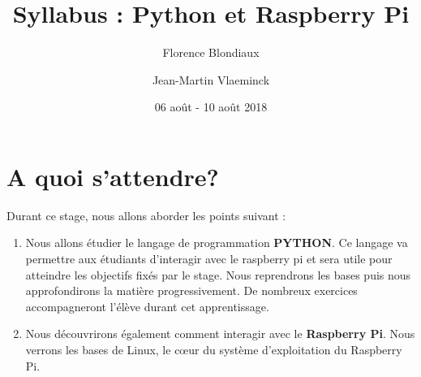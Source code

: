 \documentclass[12pt,a4paper,oneside]{report}
\title{Syllabus : Python et Raspberry Pi}
\author{Florence Blondiaux\and Jean-Martin Vlaeminck}
\date{06 août - 10 août 2018}
\begin{document}
\maketitle
\tableofcontents


\chapter{A quoi s'attendre?}

\vspace*{3cm}

Durant ce stage, nous allons aborder les points suivant :


\begin{minipage}[l]{0.70\textwidth}
	\begin{enumerate}
		\item Nous allons étudier le langage de programmation \textbf{PYTHON}. Ce langage va permettre aux étudiants d'interagir avec le raspberry pi et sera utile pour atteindre les objectifs fixés par le stage. Nous reprendrons les bases puis nous approfondirons la matière progressivement. De nombreux exercices accompagneront l'élève durant cet apprentissage.\\
		
		\item Nous découvrirons également comment interagir avec le \textbf{Raspberry Pi}. Nous verrons les bases de Linux, le c\oe{}ur du système d'exploitation du Raspberry Pi.
		
	\end{enumerate}
\end{minipage}
\hfill
\end{document}
